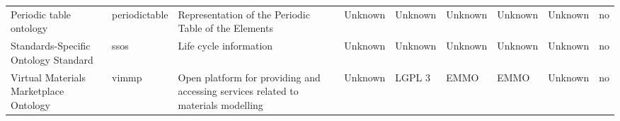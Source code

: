 \begin{tabular}{m{5cm}m{2cm}m{5cm}m{2cm}m{2cm}m{2cm}m{2cm}m{2cm}m{2cm}}
                                                          Periodic table ontology &           periodictable &                              Representation of the Periodic Table of the Elements &              Unknown &      Unknown &                      Unknown &           Unknown &    Unknown &               no \\
                        Standards-Specific Ontology Standard \cite{ssos_ontology} &                    ssos &                                                            Life cycle information &              Unknown &      Unknown &                      Unknown &           Unknown &    Unknown &               no \\
                     Virtual Materials Marketplace Ontology \cite{vimmp_ontology} &                   vimmp & Open platform for providing and accessing services related to materials modelling &              Unknown &       LGPL 3 &                         EMMO &              EMMO &    Unknown &               no \\
\bottomrule
\end{tabular}
